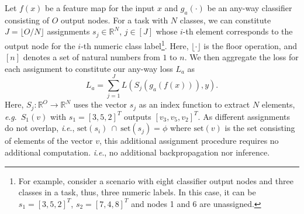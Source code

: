 \documentclass[letterpaper]{article} %
\newcommand{\jh}[1]{\textcolor{blue}{#1}}
\newcommand{\ie}{\textit{i}.\textit{e}., }
\newcommand{\eg}{\textit{e}.\textit{g}.\ }
\begin{document}
Let $f(x)$ be a feature map for the input $x$ and $g_a(\cdot)$ be an any-way classifier consisting of $O$ output nodes. For a task with $N$ classes, we can constitute $J = \lfloor O/N \rfloor$ assignments $s_j \in \mathbb{R}^N$, $j \in [J]$ whose $i$-th element corresponds to the output node for the $i$-th numeric class label\footnote{For example, consider a scenario with eight classifier output nodes and three classes in a task, thus, three numeric labels. In this case, it can be $s_1 = [3,5,2]^T$, $s_2 = [7,4,8]^T$ and nodes 1 and 6 are unassigned. }.  Here, $\lfloor \cdot \rfloor$ is the floor operation, and $[n]$ denotes a set of natural numbers from $1$ to $n$. We then aggregate the loss for each assignment to constitute our any-way loss $L_a$ as
\begin{equation}
L_{a} = \sum_{j=1}^J L(S_j(g_a(f(x))),y).
\label{eq:any-way-loss}
\end{equation}
Here, $S_j: \mathbb{R}^O \rightarrow \mathbb{R}^N$ uses the vector $s_j$ as an index function to extract $N$ elements, \eg $S_1(v)$ with $s_1 = [3,5,2]^T$ outputs $[v_3, v_5, v_2]^T$.    As different assignments do not overlap, \ie $\text{set}(s_i) \ \cap \ \text{set}(s_j) = \phi$ where $\text{set}(v)$ is the set consisting of elements of the  vector $v$, this additional assignment procedure %
requires no additional computation. \ie no additional backpropagation nor inference.  



\end{document}
